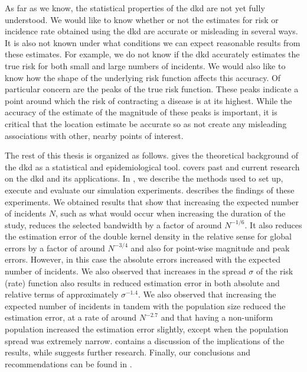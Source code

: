 As far as we know,
the statistical properties of the \gls{dkd} are not yet fully understood.
We would like to know whether or not the estimates for \gls{risk} or \gls{incidence rate}
obtained using the \gls{dkd} are accurate or misleading in several ways.
It is also not known under what conditions we can expect reasonable results from these estimates.
For example,
we do not know if the \gls{dkd} accurately estimates the true \gls{risk}
for both small and large numbers of incidents.
We would also like to know how the shape of the underlying \gls{risk} function affects this accuracy.
Of particular concern are the peaks of the true risk function.
These peaks indicate a point around which the risk of contracting a disease is at its highest.
While the accuracy of the estimate of the magnitude of these peaks is important,
it is critical that the location estimate be accurate so as not create any misleading associations
with other, nearby points of interest.

The rest of this thesis is organized as follows.
 gives the theoretical background of the \gls{dkd} as a statistical and epidemiological tool.
 covers past and current research on the \gls{dkd} and its applications.
In , we describe the methods used to set up, execute and evaluate our simulation experiments.
 describes the findings of these experiments.
We obtained results that show that increasing the expected number of incidents $N$,
such as what would occur when increasing the duration of the study,
reduces the selected bandwidth by a factor of around $N^{-1/6}$.
It also reduces the estimation error of the double kernel density in the relative sense
for global errors by a factor of around $N^{-3/4}$ and also for point-wise magnitude and peak errors.
However, in this case the absolute errors increased with the expected number of incidents.
We also observed that increases in the spread $\sigma$ of the risk (rate) function also results in reduced estimation error
in both absolute and relative terms of approximately $\sigma^{-1.4}$.
We also observed that increasing the expected number of incidents in tandem with the population size reduced the estimation error,
at a rate of around $N^{-2.7}$
and that having a non-uniform population increased the estimation error slightly, 
except when the population spread was extremely narrow.
 contains a discussion of the implications of the results,
while  suggests further research.
Finally, our conclusions and recommendations can be found in .

